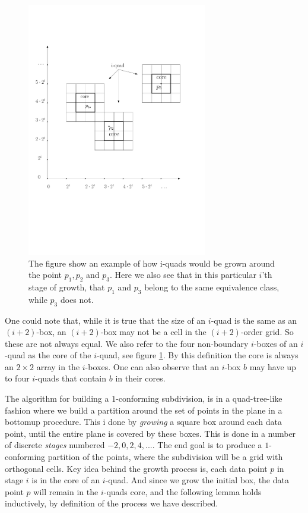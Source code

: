 \begin{figure}[H]
	\centering
	\includegraphics[width=0.7\textwidth]{figures/iquad.pdf}
	\caption{The figure show an example of how i-quads would be grown around the point $p_1, 
    		 p_2$ and $p_3$. Here we also see that in this particular $i$'th stage of growth, 
             that $p_1$ and $p_3$ belong to the same equivalence class, while $p_3$ does 
             not.}
	\label{fig:iquad}
\end{figure}

One could note that, while it is true that the size of an $i$-quad is the same as an 
$(i+2)$-box, an $(i+2)$-box may not be a cell in the $(i+2)$-order grid. So these are not 
always equal. We also refer to the four non-boundary $i$-boxes of an $i$-quad as the core of 
the $i$-quad, see figure \ref{fig:iquad}. By this definition the core is always an $2 \times 
2$ array in the $i$-boxes. One can also observe that an $i$-box $b$ may have up to four 
$i$-quads that contain $b$ in their cores.

The algorithm for building a $1$-conforming subdivision, is in a quad-tree-like fashion where 
we build a partition around the set of points in the plane in a bottomup procedure. This i done 
by \textit{growing} a square box around each data point, until the entire plane is covered by 
these boxes. This is done in a number of discrete \textit{stages} numbered $-2, 0, 2, 4,...$. 
The end goal is to produce a $1$-conforming partition of the points, where the subdivision will 
be a grid with orthogonal cells. Key idea behind the growth process is, each data point $p$ in
stage $i$ is in the core of an $i$-quad. And since we grow the initial box, the data point $p$
will remain in the $i$-quads core, and the following lemma holds inductively, by definition of
the process we have described.

